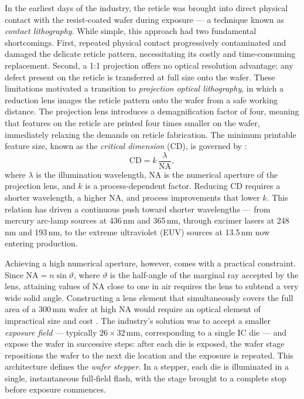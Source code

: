 In the earliest days of the industry, the reticle was brought into direct physical contact with the resist-coated wafer during exposure — a technique known as \textit{contact lithography}. While simple, this approach had two fundamental shortcomings. First, repeated physical contact progressively contaminated and damaged the delicate reticle pattern, necessitating its costly and time-consuming replacement. Second, a 1:1 projection offers no optical resolution advantage: any defect present on the reticle is transferred at full size onto the wafer. These limitations motivated a transition to \textit{projection optical lithography}, in which a reduction lens images the reticle pattern onto the wafer from a safe working distance. The projection lens introduces a demagnification factor of four, meaning that features on the reticle are printed four times smaller on the wafer, immediately relaxing the demands on reticle fabrication. The minimum printable feature size, known as the \textit{critical dimension} (CD), is governed by \cite{Schmidt2012_UltraPrecision}:
\begin{equation}
    \mathrm{CD} = k\,\frac{\lambda}{\mathrm{NA}},
    \label{eq:rayleigh}
\end{equation}
where $\lambda$ is the illumination wavelength, $\mathrm{NA}$ is the numerical aperture of the projection lens, and $k$ is a process-dependent factor. Reducing CD requires a shorter wavelength, a higher NA, and process improvements that lower $k$. This relation has driven a continuous push toward shorter wavelengths — from mercury arc-lamp sources at 436\,nm and 365\,nm, through excimer lasers at 248\,nm and 193\,nm, to the extreme ultraviolet (EUV) sources at 13.5\,nm now entering production.

Achieving a high numerical aperture, however, comes with a practical constraint. Since $\mathrm{NA} = n\sin\vartheta$, where $\vartheta$ is the half-angle of the marginal ray accepted by the lens, attaining values of NA close to one in air requires the lens to subtend a very wide solid angle. Constructing a lens element that simultaneously covers the full area of a 300\,mm wafer at high NA would require an optical element of impractical size and cost \cite{Schmidt2012_UltraPrecision}. The industry's solution was to accept a smaller \textit{exposure field} — typically $26 \times 32$\,mm, corresponding to a single IC die — and expose the wafer in successive steps: after each die is exposed, the wafer stage repositions the wafer to the next die location and the exposure is repeated. This architecture defines the \textit{wafer stepper}. In a stepper, each die is illuminated in a single, instantaneous full-field flash, with the stage brought to a complete stop before exposure commences.

